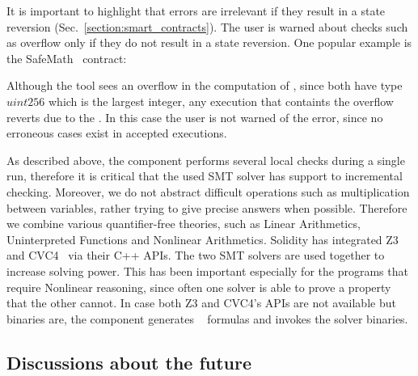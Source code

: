 It is important to highlight that errors are irrelevant if they result in a
state reversion (Sec.~\ref{section:smart_contracts}). The user is warned
about checks such as overflow only if they do not result in a state reversion.
%
One popular example is the SafeMath~\cite{SafeMath} contract:

\begin{verb}
  function add(uint256 a, uint256 b) internal pure returns (uint256) {
    uint256 c = a + b;
    assert(c >= a);
    return c;
  \}
\end{verb}

Although the tool sees an overflow in the computation of , since
both have type $uint256$ which is the largest integer, any execution that
containts the overflow reverts due to the .
%
In this case the user is not warned of the error, since no erroneous cases
exist in accepted executions.

As described above, the component performs several local checks during a single
run, therefore it is critical that the used SMT solver has support to
incremental checking.
%
Moreover, we do not abstract difficult operations such as multiplication
between variables, rather trying to give precise answers when possible.
%
Therefore we combine various quantifier-free theories, such as Linear
Arithmetics, Uninterpreted Functions and Nonlinear Arithmetics. 
%
Solidity has integrated Z3~\cite{Z3} and CVC4~\cite{CVC4} via their C++ APIs.
%
The two SMT solvers are used together to increase solving power.
%
This has been important especially for the programs that require Nonlinear
reasoning, since often one solver is able to prove a property that the other
cannot.
%
In case both Z3 and CVC4's APIs are not available but binaries are, the
component generates ~\cite{SMTLIB} formulas and invokes the
solver binaries.


\subsection{Discussions about the future}

\\
\\
